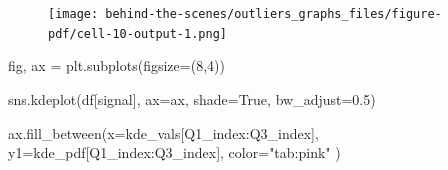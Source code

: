 \documentclass[
  letterpaper,
  DIV=11,
  numbers=noendperiod,
  oneside]{scrreprt}
\newenvironment{Shaded}{\begin{snugshade}}{\end{snugshade}}
\newcommand{\DecValTok}[1]{\textcolor[rgb]{0.68,0.00,0.00}{#1}}
\newcommand{\FloatTok}[1]{\textcolor[rgb]{0.68,0.00,0.00}{#1}}
\newcommand{\NormalTok}[1]{\textcolor[rgb]{0.00,0.23,0.31}{#1}}
\newcommand{\OperatorTok}[1]{\textcolor[rgb]{0.37,0.37,0.37}{#1}}
\newcommand{\StringTok}[1]{\textcolor[rgb]{0.13,0.47,0.30}{#1}}
\newcommand{\VariableTok}[1]{\textcolor[rgb]{0.07,0.07,0.07}{#1}}
\begin{document}
\begin{figure}[H]

{\centering \texttt{[image: behind-the-scenes/outliers\_graphs\_files/figure-pdf/cell-10-output-1.png]}

}

\end{figure}

\begin{Shaded}
\begin{Highlighting}[]
\NormalTok{fig, ax }\OperatorTok{=}\NormalTok{ plt.subplots(figsize}\OperatorTok{=}\NormalTok{(}\DecValTok{8}\NormalTok{,}\DecValTok{4}\NormalTok{))}

\NormalTok{sns.kdeplot(df[}\StringTok{\textquotesingle{}signal\textquotesingle{}}\NormalTok{], ax}\OperatorTok{=}\NormalTok{ax, shade}\OperatorTok{=}\VariableTok{True}\NormalTok{, bw\_adjust}\OperatorTok{=}\FloatTok{0.5}\NormalTok{)}

\NormalTok{ax.fill\_between(x}\OperatorTok{=}\NormalTok{kde\_vals[Q1\_index:Q3\_index],}
\NormalTok{                y1}\OperatorTok{=}\NormalTok{kde\_pdf[Q1\_index:Q3\_index],}
\NormalTok{                color}\OperatorTok{=}\StringTok{"tab:pink"}
\NormalTok{                )}


\end{Highlighting}
\end{Shaded}
\end{document}
